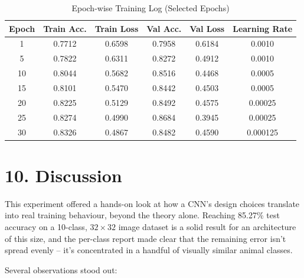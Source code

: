 \documentclass[11pt]{article}
\begin{document}
\begin{table}[H]
\centering
\caption{Epoch-wise Training Log (Selected Epochs)}
\begin{tabular}{cccccc}
\toprule
Epoch & Train Acc. & Train Loss & Val Acc. & Val Loss & Learning Rate \\
\midrule
1  & 0.7712 & 0.6598 & 0.7958 & 0.6184 & 0.0010 \\
5  & 0.7822 & 0.6311 & 0.8272 & 0.4912 & 0.0010 \\
10 & 0.8044 & 0.5682 & 0.8516 & 0.4468 & 0.0005 \\
15 & 0.8101 & 0.5470 & 0.8442 & 0.4503 & 0.0005 \\
20 & 0.8225 & 0.5129 & 0.8492 & 0.4575 & 0.00025 \\
25 & 0.8274 & 0.4990 & 0.8684 & 0.3945 & 0.00025 \\
30 & 0.8326 & 0.4867 & 0.8482 & 0.4590 & 0.000125 \\
\bottomrule
\end{tabular}
\end{table}


\section*{10. Discussion}

This experiment offered a hands-on look at how a CNN's design choices translate into real training behaviour, beyond the theory alone. Reaching 85.27\% test accuracy on a 10-class, $32\times32$ image dataset is a solid result for an architecture of this size, and the per-class report made clear that the remaining error isn't spread evenly -- it's concentrated in a handful of visually similar animal classes.

Several observations stood out:
\end{document}
